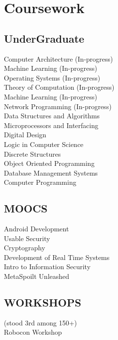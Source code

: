\documentclass[]{deedy-resume-openfont}
\begin{document}
\begin{minipage}[t]{0.33\textwidth}
\section{Coursework}
\subsection{UnderGraduate}
Computer Architecture (In-progress) \\
Machine Learning (In-progress) \\
Operating Systems (In-progress) \\
Theory of Computation (In-progress) \\
Machine Learning (In-progress) \\
Network Programming (In-progress) \\
Data Structures and Algorithms \\
Microprocessors and Interfacing \\
Digital Design \\
Logic in Computer Science \\
Discrete Structures \\
Object Oriented Programming \\
Database Management Systems \\
Computer Programming \\
\sectionsep

\subsection{MOOCS}
Android Development \\
Usable Security \\
Cryptography \\
Development of Real Time Systems \\
Intro to Information Security \\
MetaSpoilt Unleashed \\
\sectionsep

\subsection{WORKSHOPS}
\href{http://www.bits-pilani.ac.in/}{} (stood 3rd among 150+) \\
Robocon Workshop \\
\sectionsep



\end{minipage}
\end{document}
